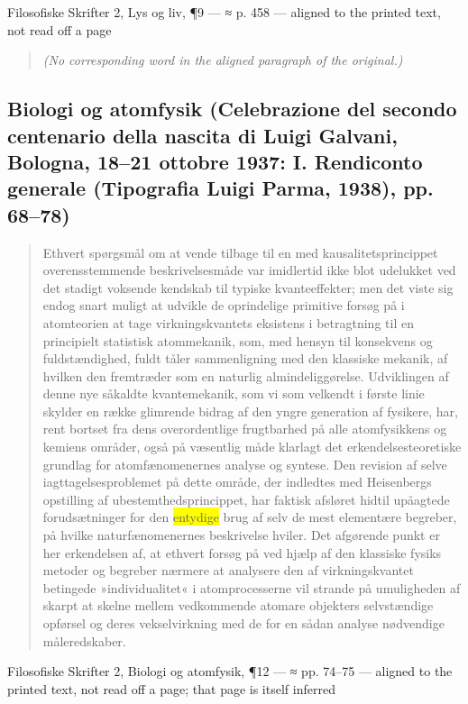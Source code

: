 \documentclass[11pt]{article}
\newcommand{\dcite}[1]{{\nopagebreak\raggedleft\small #1\par}\medskip}
\newcommand{\tlg}[1]{{\setlength{\fboxsep}{0.8pt}\colorbox{yellow}{#1}}}
\begin{document}
\dcite{Filosofiske Skrifter 2, Lys og liv, ¶9 — ≈ p. 458 — aligned to the printed text, not read off a page}
{\footnotesize\begin{quote}\itshape (No corresponding word in the aligned paragraph of the original.)\end{quote}}

\subsection{Biologi og atomfysik \normalfont(Celebrazione del secondo centenario della nascita di Luigi Galvani, Bologna, 18–21 ottobre 1937: I. Rendiconto generale (Tipografia Luigi Parma, 1938), pp. 68–78)}

\begin{quote}
Ethvert spørgsmål om at vende tilbage til en med kausalitetsprincippet overensstemmende beskrivelsesmåde var imidlertid ikke blot udelukket ved det stadigt voksende kendskab til typiske kvanteeffekter; men det viste sig endog snart muligt at udvikle de oprindelige primitive forsøg på i atomteorien at tage virkningskvantets eksistens i betragtning til en principielt statistisk atommekanik, som, med hensyn til konsekvens og fuldstændighed, fuldt tåler sammenligning med den klassiske mekanik, af hvilken den fremtræder som en naturlig almindeliggørelse. Udviklingen af denne nye såkaldte kvantemekanik, som vi som velkendt i første linie skylder en række glimrende bidrag af den yngre generation af fysikere, har, rent bortset fra dens overordentlige frugtbarhed på alle atomfysikkens og kemiens områder, også på væsentlig måde klarlagt det erkendelsesteoretiske grundlag for atomfænomenernes analyse og syntese. Den revision af selve iagttagelsesproblemet på dette område, der indledtes med Heisenbergs opstilling af ubestemthedsprincippet, har faktisk afsløret hidtil upåagtede forudsætninger for den \tlg{entydige} brug af selv de mest elementære begreber, på hvilke naturfænomenernes beskrivelse hviler. Det afgørende punkt er her erkendelsen af, at ethvert forsøg på ved hjælp af den klassiske fysiks metoder og begreber nærmere at analysere den af virkningskvantet betingede »individualitet« i atomprocesserne vil strande på umuligheden af skarpt at skelne mellem vedkommende atomare objekters selvstændige opførsel og deres vekselvirkning med de for en sådan analyse nødvendige måleredskaber.
\end{quote}
\dcite{Filosofiske Skrifter 2, Biologi og atomfysik, ¶12 — ≈ pp. 74–75 — aligned to the printed text, not read off a page; that page is itself inferred}
\end{document}
